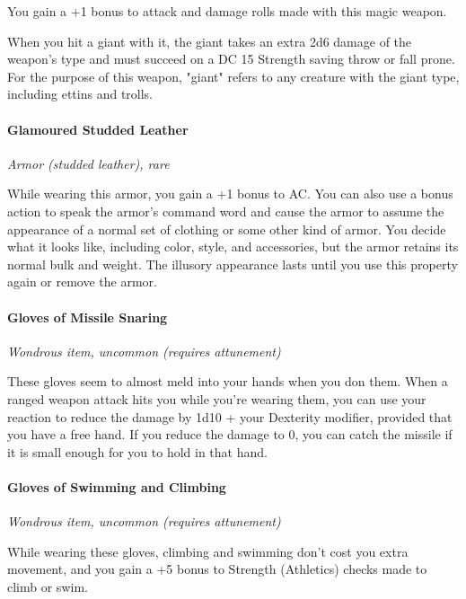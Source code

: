 \documentclass[
]{article}
\begin{document}
You gain a +1 bonus to attack and damage rolls made with this magic
weapon.

When you hit a giant with it, the giant takes an extra 2d6 damage of the
weapon's type and must succeed on a DC 15 Strength saving throw or fall
prone. For the purpose of this weapon, "giant" refers to any creature
with the giant type, including ettins and trolls.

\hypertarget{glamoured-studded-leather}{%
\paragraph{Glamoured Studded Leather}\label{glamoured-studded-leather}}

\emph{Armor (studded leather), rare}

While wearing this armor, you gain a +1 bonus to AC. You can also use a
bonus action to speak the armor's command word and cause the armor to
assume the appearance of a normal set of clothing or some other kind of
armor. You decide what it looks like, including color, style, and
accessories, but the armor retains its normal bulk and weight. The
illusory appearance lasts until you use this property again or remove
the armor.

\hypertarget{gloves-of-missile-snaring}{%
\paragraph{Gloves of Missile Snaring}\label{gloves-of-missile-snaring}}

\emph{Wondrous item, uncommon (requires attunement)}

These gloves seem to almost meld into your hands when you don them. When
a ranged weapon attack hits you while you're wearing them, you can use
your reaction to reduce the damage by 1d10 + your Dexterity modifier,
provided that you have a free hand. If you reduce the damage to 0, you
can catch the missile if it is small enough for you to hold in that
hand.

\hypertarget{gloves-of-swimming-and-climbing}{%
\paragraph{Gloves of Swimming and
Climbing}\label{gloves-of-swimming-and-climbing}}

\emph{Wondrous item, uncommon (requires attunement)}

While wearing these gloves, climbing and swimming don't cost you extra
movement, and you gain a +5 bonus to Strength (Athletics) checks made to
climb or swim.
\end{document}
